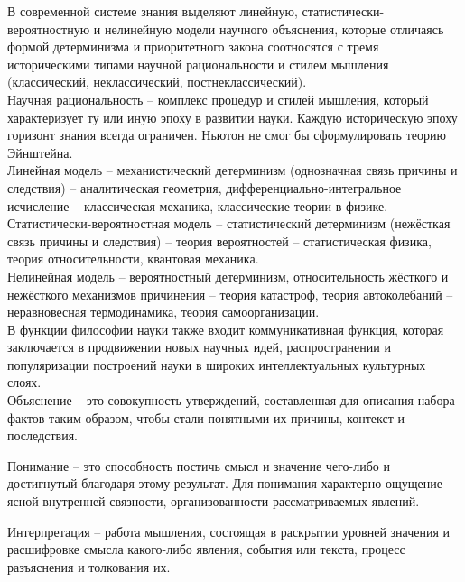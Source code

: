 \documentclass[exam_answers.tex]{subfiles}
\begin{document}
\renewcommand{\baselinestretch}{0.75}

В современной системе знания выделяют линейную, статистически-вероятностную и нелинейную модели научного объяснения, которые отличаясь формой детерминизма и приоритетного закона соотносятся с тремя историческими типами научной рациональности и стилем мышления (классический, неклассический, постнеклассический).
\\

Научная рациональность – комплекс процедур и стилей мышления, который характеризует ту или иную эпоху в развитии науки. Каждую историческую эпоху горизонт знания всегда ограничен. Ньютон не смог бы сформулировать теорию Эйнштейна.
\\

Линейная модель – механистический детерминизм (однозначная связь причины и следствия) – аналитическая геометрия, дифференциально-интегральное исчисление – классическая механика, классические теории в физике.
\\

Статистически-вероятностная модель – статистический детерминизм (нежёсткая связь причины и следствия) – теория вероятностей – статистическая физика, теория относительности, квантовая механика.
\\

Нелинейная модель – вероятностный детерминизм, относительность жёсткого и нежёсткого механизмов причинения – теория катастроф, теория автоколебаний – неравновесная термодинамика, теория самоорганизации.
\\

В функции философии науки также входит коммуникативная функция, которая заключается в продвижении новых научных идей, распространении и популяризации построений науки в широких интеллектуальных культурных слоях.
\\

Объяснение – это совокупность утверждений, составленная для описания набора фактов таким образом, чтобы стали понятными их причины, контекст и последствия.

Понимание – это способность постичь смысл и значение чего-либо и достигнутый благодаря этому результат.
Для понимания характерно ощущение ясной внутренней связности, организованности рассматриваемых явлений.

Интерпретация – работа мышления, состоящая в раскрытии уровней значения и расшифровке смысла какого-либо явления, события или текста, процесс разъяснения и толкования их.
\end{document}
